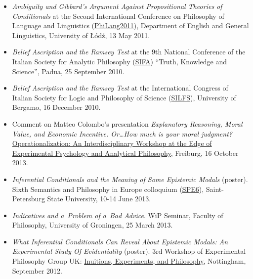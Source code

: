 \documentclass[a4paper,12pt]{article}
\begin{document}
\begin{small}
\begin{itemize}
  \item \emph{Ambiguity and Gibbard's Argument Against Propositional
      Theories of Conditionals} at the Second International Conference
    on Philosophy of Language and Linguistics
    (\href{http://ia.uni.lodz.pl/linguistics/events/philang-2011}{PhiLang2011}),
    Department of English and General Linguistics, University of Łódź,
    13 May
    2011. %

  \item \emph{Belief Ascription and the Ramsey Test} at the 9th
    National Conference of the Italian Society for Analytic Philosophy
    (\href{http://www.filosofia.lettere.unipd.it/analitica/sifa2010/}{SIFA})
    ``Truth, Knowledge and Science'', Padua, 25 September
    2010. %

    
  \item \emph{Belief Ascription and the Ramsey Test} at the
    International Congress of Italian Society for Logic and Philosophy
    of Science
    (\href{http://dinamico2.unibg.it/silfs/convegno2010.htm}{SILFS}),
    University of Bergamo, 16 December
    2010. %
  \end{itemize}
  

  \begin{itemize}

\item Comment on Matteo Colombo's presentation \emph{Explanatory Reasoning, Moral Value, and Economic Incentive. Or\ldots How much is your moral judgment?} 
    \href{http://www.psychologie.uni-freiburg.de/Members/singmann/operational2013}{Operationalization: An Interdisciplinary Workshop at the Edge of Experimental Psychology and Analytical Philosophy}, Freiburg, 16 October 2013.

  \item \emph{Inferential Conditionals and the Meaning of Some
      Epistemic Modals} (poster). Sixth Semantics and Philosophy
    in Europe colloquium
    (\href{http://spe6conference.wordpress.com}{SPE6}),
    Saint-Petersburg State University, 10-14 June 2013.
    
  \item \emph{Indicatives and a~Problem of a~Bad Advice}. WiP
    Seminar, Faculty of Philosophy, University of Groningen, 25 March
    2013.
    
  \item \emph{What Inferential Conditionals Can Reveal About Epistemic
      Modals: An Experimental Study Of Evidentiality} (poster).
    3rd Workshop of Experimental Philosophy Group UK:
    \href{https://www.nottingham.ac.uk/philosophy/research/conferences/workshop-intuitions-experimentsandphilosophy.aspx}{Inuitions,
      Experiments, and Philosophy}, Nottingham, September 2012.


\end{itemize}
\end{small}
\end{document}

